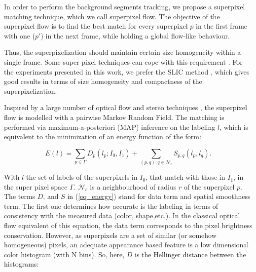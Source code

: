 \label{sec:suppix}

In order to perform the background segments tracking,  we propose a superpixel matching technique, 
which we call superpixel flow. The objective of the superpixel flow is to find the best match for every superpixel $p$ in the first 
frame with one ($p'$) in the next frame, while holding a global flow-like behaviour.

Thus, the superpixelization should maintain certain size homogeneity within a single frame. Some super
pixel techniques can cope with this requirement \cite{c9}\cite{c10}. For the experiments presented 
in this work, we prefer the SLIC method \cite{c9}, which gives
good results in terms of size homogeneity and compactness of the superpixelization. 


Inspired by a large number of optical flow and stereo techniques \cite{c7}\cite{c12}\cite{c13}, 
the superpixel flow is modelled with a pairwise Markov Random Field. The matching is performed via maximum-a-posteriori (MAP) inference on the labeling $l$, which is equivalent to the minimization of an energy function of the form:

\begin{equation}
E(l) = \displaystyle \sum_{p \in \Gamma} D_p(l_p;I_0,I_1) +
\sum_{(p,q): q \in \mathcal{N}_r} S_{p,q}(l_p,l_q) .
\label{eq_energy}
\end{equation}

With $l$ the set of labels of the superpixels in $I_0$,
that match with those in $I_1$, in the super pixel space $\Gamma$. $\mathcal{N}_r$ is a neighbourhood of radius $r$ of the superpixel $p$.
The terms $D$, and $S$ in (\ref{eq_energy}) stand for data term and spatial smoothness term. 
The first one determines how accurate is the labeling in terms
of consistency with the measured data (color, shape,etc.). In the classical optical flow equivalent of this equation,
the data term corresponds to the pixel brightness conservation\cite{c7}\cite{c5}. However, as superpixels are a set
of similar (or somehow homogeneous) pixels, an adequate appearance based feature is a low dimensional
color histogram (with N bins). So, here, $D$ is the Hellinger distance between the histograms:

